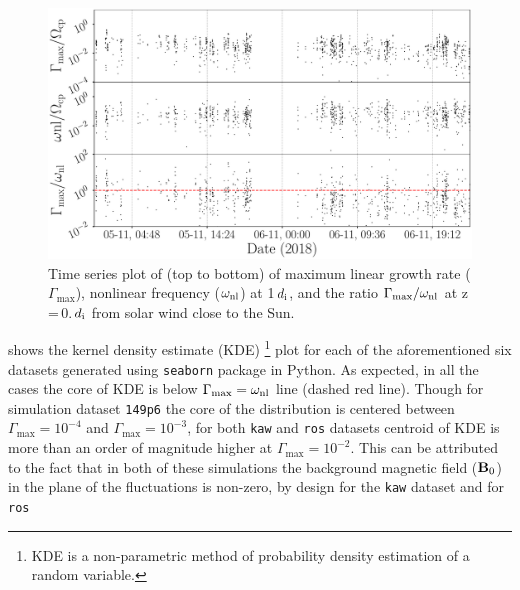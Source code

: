         \begin{figure}
            \begin{center}
                \includegraphics[width=1.\textwidth]{figures/chap7/psp_gamma_omega_ratio_2018-11-5_2018-11-7_00043197_00060477.pdf}
                \caption[Comparison plot of $\Gamma_{\max}$, $\omega_{\rm nl}$ and
                $\Gamma_{\max}/\omega_{\rm nl}$ for \texttt{psp} dataset]{Time series plot of (top
                to bottom) of maximum linear growth rate ($\Gamma_{\max}$), nonlinear frequency
                ($\omega_{\rm nl}$) at 1\,$d_{\rm i}$, and the ratio $\Gamma_{\max}/\omega_{\rm nl}$
                at z\,=\,0.\,$d_{\rm i}$ from solar wind close to the Sun.}
                \label{fig:ratio_psp}
            \end{center}
        \end{figure}
         shows the kernel density estimate (KDE) \footnote{KDE is a
        non-parametric method of probability density estimation of a random variable.} plot for each
        of the aforementioned six datasets generated using \texttt{seaborn} package in Python. As
        expected, in all the cases the core of KDE is below $\Gamma_{\max} = \omega_{\rm nl}$ line
        (dashed red line). Though for simulation dataset \texttt{149p6} the core of the distribution
        is centered between $\Gamma_{\max} = 10^{-4}$ and $\Gamma_{\max} = 10^{-3}$, for both
        \texttt{kaw} and \texttt{ros} datasets centroid of KDE is more than an order of magnitude
        higher at $\Gamma_{\max} = 10^{-2}$. This can be attributed to the fact that in both of
        these simulations the background magnetic field ($\mathbf{B_{\rm 0}}$) in the plane of the
        fluctuations is non-zero, by design for the \texttt{kaw} dataset and for \texttt{ros}
